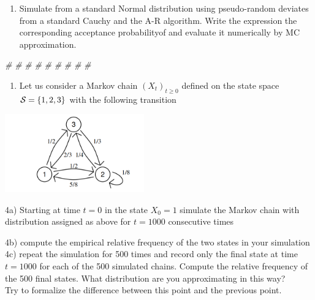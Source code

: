 \documentclass[]{article}
\newenvironment{Shaded}{\begin{snugshade}}{\end{snugshade}}
\newcommand{\CommentTok}[1]{\textcolor[rgb]{0.56,0.35,0.01}{\textit{#1}}}
\providecommand{\tightlist}{%
  \setlength{\itemsep}{0pt}\setlength{\parskip}{0pt}}
\begin{document}
\newpage

\begin{enumerate}
\def\labelenumi{\arabic{enumi})}
\setcounter{enumi}{2}
\tightlist
\item
  Simulate from a standard Normal distribution using pseudo-random
  deviates from a standard Cauchy and the A-R algorithm. Write the
  expression the corresponding acceptance probabilityof and evaluate it
  numerically by MC approximation.
\end{enumerate}

\begin{Shaded}
\begin{Highlighting}[]
\CommentTok{#}
\CommentTok{#}
\CommentTok{#}
\CommentTok{#}
\CommentTok{#}
\CommentTok{#}
\CommentTok{#}
\CommentTok{#}
\CommentTok{#}
\end{Highlighting}
\end{Shaded}

\newpage

\begin{enumerate}
\def\labelenumi{\arabic{enumi})}
\setcounter{enumi}{3}
\tightlist
\item
  Let us consider a Markov chain \((X_t)_{t \geq 0}\) defined on the
  state space \({\cal S}=\{1,2,3\}\) with the following transition
\end{enumerate}

\begin{center} 
\includegraphics[width=6cm]{frog.png} 
\end{center}

4a) Starting at time \(t=0\) in the state \(X_0=1\) simulate the Markov
chain with distribution assigned as above for \(t=1000\) consecutive
times

4b) compute the empirical relative frequency of the two states in your
simulation 4c) repeat the simulation for 500 times and record only the
final state at time \(t=1000\) for each of the 500 simulated chains.
Compute the relative frequency of the 500 final states. What
distribution are you approximating in this way?\\
Try to formalize the difference between this point and the previous
point.
\end{document}
